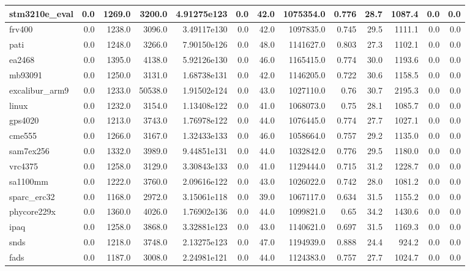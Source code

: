 \begin{tabular}{|l r r r r| r r r r r r | r r|}
\hline
stm3210e\_eval & 0.0 & 1269.0 & 3200.0 & 4.91275e123 & 0.0 & 42.0 & 1075354.0 & 0.776 & 28.7 & 1087.4 & 0.0 & 0.0 \\
\hline
frv400 & 0.0 & 1238.0 & 3096.0 & 3.49117e130 & 0.0 & 42.0 & 1097835.0 & 0.745 & 29.5 & 1111.1 & 0.0 & 0.0 \\
\hline
pati & 0.0 & 1248.0 & 3266.0 & 7.90150e126 & 0.0 & 48.0 & 1141627.0 & 0.803 & 27.3 & 1102.1 & 0.0 & 0.0 \\
\hline
ea2468 & 0.0 & 1395.0 & 4138.0 & 5.92126e130 & 0.0 & 46.0 & 1165415.0 & 0.774 & 30.0 & 1193.6 & 0.0 & 0.0 \\
\hline
mb93091 & 0.0 & 1250.0 & 3131.0 & 1.68738e131 & 0.0 & 42.0 & 1146205.0 & 0.722 & 30.6 & 1158.5 & 0.0 & 0.0 \\
\hline
excalibur\_arm9 & 0.0 & 1233.0 & 50538.0 & 1.91502e124 & 0.0 & 43.0 & 1027110.0 & 0.76 & 30.7 & 2195.3 & 0.0 & 0.0 \\
\hline
linux & 0.0 & 1232.0 & 3154.0 & 1.13408e122 & 0.0 & 41.0 & 1068073.0 & 0.75 & 28.1 & 1085.7 & 0.0 & 0.0 \\
\hline
gps4020 & 0.0 & 1213.0 & 3743.0 & 1.76978e122 & 0.0 & 44.0 & 1076445.0 & 0.774 & 27.7 & 1027.1 & 0.0 & 0.0 \\
\hline
cme555 & 0.0 & 1266.0 & 3167.0 & 1.32433e133 & 0.0 & 46.0 & 1058664.0 & 0.757 & 29.2 & 1135.0 & 0.0 & 0.0 \\
\hline
sam7ex256 & 0.0 & 1332.0 & 3989.0 & 9.44851e131 & 0.0 & 44.0 & 1032842.0 & 0.776 & 29.5 & 1180.0 & 0.0 & 0.0 \\
\hline
vrc4375 & 0.0 & 1258.0 & 3129.0 & 3.30843e133 & 0.0 & 41.0 & 1129444.0 & 0.715 & 31.2 & 1228.7 & 0.0 & 0.0 \\
\hline
sa1100mm & 0.0 & 1222.0 & 3760.0 & 2.09616e122 & 0.0 & 43.0 & 1026022.0 & 0.742 & 28.0 & 1081.2 & 0.0 & 0.0 \\
\hline
sparc\_erc32 & 0.0 & 1168.0 & 2972.0 & 3.15061e118 & 0.0 & 39.0 & 1067117.0 & 0.634 & 31.5 & 1155.2 & 0.0 & 0.0 \\
\hline
phycore229x & 0.0 & 1360.0 & 4026.0 & 1.76902e136 & 0.0 & 44.0 & 1099821.0 & 0.65 & 34.2 & 1430.6 & 0.0 & 0.0 \\
\hline
ipaq & 0.0 & 1258.0 & 3868.0 & 3.32881e123 & 0.0 & 43.0 & 1140621.0 & 0.697 & 31.5 & 1169.3 & 0.0 & 0.0 \\
\hline
snds & 0.0 & 1218.0 & 3748.0 & 2.13275e123 & 0.0 & 47.0 & 1194939.0 & 0.888 & 24.4 & 924.2 & 0.0 & 0.0 \\
\hline
fads & 0.0 & 1187.0 & 3008.0 & 2.24981e121 & 0.0 & 44.0 & 1124383.0 & 0.757 & 27.7 & 1024.7 & 0.0 & 0.0 \\

\end{tabular}
